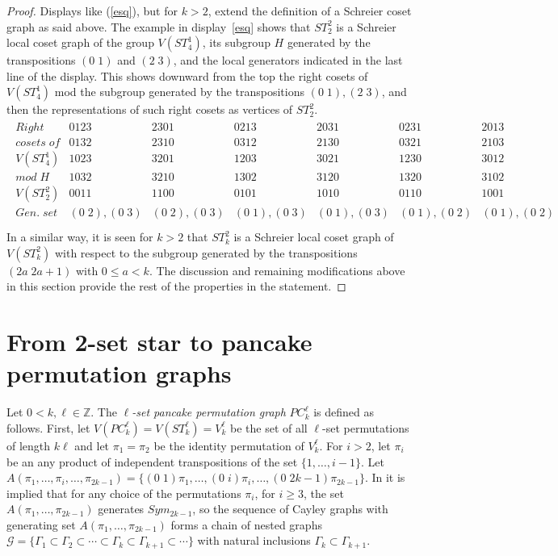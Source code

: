 \documentclass[12pt,reqno]{article}
\begin{document}
\begin{proof} 
Displays like (\ref{esq}), but for $k>2$, extend the definition of a Schreier coset graph as  said above. The example in display~\ref{esq} shows that $ST^2_2$ is a Schreier local coset graph of the group $V(ST^1_4)$, its subgroup $H$ generated by the transpositions $(0\;1)$ and $(2\;3)$, and the local generators indicated in the last line of the display. This shows downward from the top the right cosets of $V(ST^1_4)$ mod the subgroup generated by the transpositions $(0\;1),(2\;3)$, and then the representations of such right cosets as vertices of $ST^2_2$.  
\begin{eqnarray}\label{esq}
\begin{array}{l||c|c|c|c|c|c}
Right                &0123 & 2301 &0213 &2031 &0231&2013\\
cosets\; of        &0132 &2310  &0312 &2130 &0321&2103\\
V(ST^1_4)         &1023 &3201  &1203 &3021 &1230&3012\\
mod\;H             &1032  &3210 &1302 &3120 &1320&3102 \\\hline
V(ST^2_2)         &0011 &1100  &0101 &1010 &0110&1001\\\hline
Gen.\; set&(0\;2),(0\;3)&(0\;2),(0\;3)&(0\;1),(0\;3)&(0\;1),(0\;3)&(0\;1),(0\;2)&(0\;1),(0\;2)\\
\end{array}
\end{eqnarray}
In a similar way, it is seen for $k>2$ that $ST^2_k$ is a Schreier local coset graph of $V(ST^2_k)$ with respect to the subgroup generated by the transpositions $(2a\;2a+1)$ with $0\le a<k$. The discussion and remaining modifications above in this section provide the rest of the properties in the statement.
\end{proof}

\section{From 2-set star to pancake permutation graphs}\label{panqueque}

Let $0<k,\ell\in\mathbb{Z}$. The {\it $\ell$-set pancake permutation graph} $PC_k^\ell$ is defined as follows. First, let $V(PC_k^\ell)=V(ST_k^\ell)=V^\ell_k$ be the set of all $\ell$-set permutations of length $k\ell$ and let $\pi_1=\pi_2$ be the  identity permutation of $V_k^\ell$. For $i>2$, let  $\pi_i$ be an any product of independent transpositions of the set $\{1,\ldots,i-1\}$. Let $A(\pi_1,\ldots,\pi_i,\ldots,\pi_{2k-1})=\{(0\;1)\pi_1,\ldots,(0\;i)\pi_i,\ldots,(0\;2k-1)\pi_{2k-1}\}.$ In \cite[Lemma 2]{D73} it is implied that for any choice of the permutations $\pi_i$, for $i\ge 3$, the set $A(\pi_1,\ldots,\pi_{2k-1})$ generates $Sym_{2k-1}$, so the sequence of Cayley graphs with generating set $A(\pi_1,\ldots,\pi_{2k-1})$ forms a chain of nested graphs ${\mathcal G}=\{\Gamma_1\subset\Gamma_2\subset\cdots\subset\Gamma_k\subset\Gamma_{k+1}\subset\cdots\}$
 with natural inclusions $\Gamma_k\subset\Gamma_{k+1}$.
\end{document}
